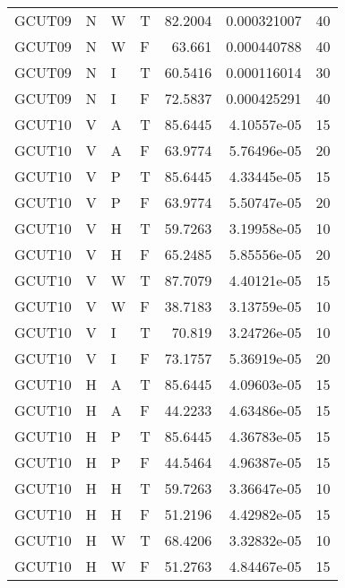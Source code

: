 \begin{longtable}{llllrrr}
    GCUT09   & N     & W     & T          & 82.2004    & 0.000321007 & 40       \\
    GCUT09   & N     & W     & F          & 63.661     & 0.000440788 & 40       \\
    GCUT09   & N     & I     & T          & 60.5416    & 0.000116014 & 30       \\
    GCUT09   & N     & I     & F          & 72.5837    & 0.000425291 & 40       \\
    GCUT10   & V     & A     & T          & 85.6445    & 4.10557e-05 & 15       \\
    GCUT10   & V     & A     & F          & 63.9774    & 5.76496e-05 & 20       \\
    GCUT10   & V     & P     & T          & 85.6445    & 4.33445e-05 & 15       \\
    GCUT10   & V     & P     & F          & 63.9774    & 5.50747e-05 & 20       \\
    GCUT10   & V     & H     & T          & 59.7263    & 3.19958e-05 & 10       \\
    GCUT10   & V     & H     & F          & 65.2485    & 5.85556e-05 & 20       \\
    GCUT10   & V     & W     & T          & 87.7079    & 4.40121e-05 & 15       \\
    GCUT10   & V     & W     & F          & 38.7183    & 3.13759e-05 & 10       \\
    GCUT10   & V     & I     & T          & 70.819     & 3.24726e-05 & 10       \\
    GCUT10   & V     & I     & F          & 73.1757    & 5.36919e-05 & 20       \\
    GCUT10   & H     & A     & T          & 85.6445    & 4.09603e-05 & 15       \\
    GCUT10   & H     & A     & F          & 44.2233    & 4.63486e-05 & 15       \\
    GCUT10   & H     & P     & T          & 85.6445    & 4.36783e-05 & 15       \\
    GCUT10   & H     & P     & F          & 44.5464    & 4.96387e-05 & 15       \\
    GCUT10   & H     & H     & T          & 59.7263    & 3.36647e-05 & 10       \\
    GCUT10   & H     & H     & F          & 51.2196    & 4.42982e-05 & 15       \\
    GCUT10   & H     & W     & T          & 68.4206    & 3.32832e-05 & 10       \\
    GCUT10   & H     & W     & F          & 51.2763    & 4.84467e-05 & 15       \\

\end{longtable}
